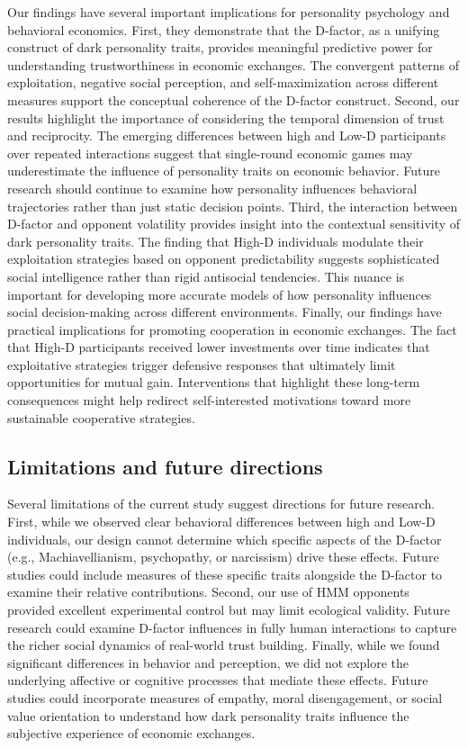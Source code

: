 \documentclass[
]{article}
\begin{document}
Our findings have several important implications for personality psychology and behavioral economics. First, they demonstrate that the D-factor, as a unifying construct of dark personality traits, provides meaningful predictive power for understanding trustworthiness in economic exchanges. The convergent patterns of exploitation, negative social perception, and self-maximization across different measures support the conceptual coherence of the D-factor construct.
Second, our results highlight the importance of considering the temporal dimension of trust and reciprocity. The emerging differences between high and Low-D participants over repeated interactions suggest that single-round economic games may underestimate the influence of personality traits on economic behavior. Future research should continue to examine how personality influences behavioral trajectories rather than just static decision points.
Third, the interaction between D-factor and opponent volatility provides insight into the contextual sensitivity of dark personality traits. The finding that High-D individuals modulate their exploitation strategies based on opponent predictability suggests sophisticated social intelligence rather than rigid antisocial tendencies. This nuance is important for developing more accurate models of how personality influences social decision-making across different environments.
Finally, our findings have practical implications for promoting cooperation in economic exchanges. The fact that High-D participants received lower investments over time indicates that exploitative strategies trigger defensive responses that ultimately limit opportunities for mutual gain. Interventions that highlight these long-term consequences might help redirect self-interested motivations toward more sustainable cooperative strategies.

\subsection{Limitations and future directions}\label{limitations-and-future-directions}

Several limitations of the current study suggest directions for future research. First, while we observed clear behavioral differences between high and Low-D individuals, our design cannot determine which specific aspects of the D-factor (e.g., Machiavellianism, psychopathy, or narcissism) drive these effects. Future studies could include measures of these specific traits alongside the D-factor to examine their relative contributions.
Second, our use of HMM opponents provided excellent experimental control but may limit ecological validity. Future research could examine D-factor influences in fully human interactions to capture the richer social dynamics of real-world trust building.
Finally, while we found significant differences in behavior and perception, we did not explore the underlying affective or cognitive processes that mediate these effects. Future studies could incorporate measures of empathy, moral disengagement, or social value orientation to understand how dark personality traits influence the subjective experience of economic exchanges.
\end{document}
